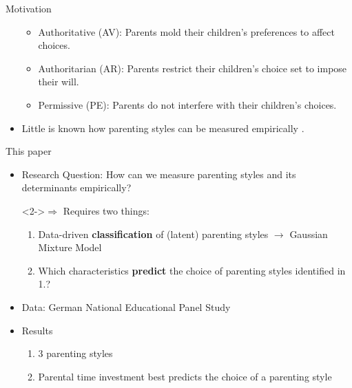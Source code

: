\documentclass[notes, 12.5pt, aspectratio=169]{beamer}
\begin{document}
\begin{frame}{Motivation}
\begin{itemize}[(I)]
\begin{itemize}
			\item<4-> Authoritative (AV): Parents mold their children's preferences to affect choices.
			\item<5-> Authoritarian (AR): Parents restrict their children's choice set to impose their will.
			\item<6-> Permissive (PE): Parents do not interfere with their children's choices.
		\end{itemize}
		\vspace{10pt}
		\item<7-> Little is known how parenting styles can be measured empirically \parencites{chanParentingStyleYouth2011}{rauhParentingTypes2020}.
	\end{itemize}
\end{frame}
%
\begin{frame}{This paper}
	\begin{itemize}[(I)]
		\item<1-> Research Question: How can we measure parenting styles and its determinants empirically?
		\item[]<2->$\Longrightarrow$ Requires two things:
		\begin{enumerate}
			\item<2-> Data-driven \textbf{classification} of (latent) parenting styles $\rightarrow$ Gaussian Mixture Model \parencite{hastieElementsStatisticalLearning2009}
			\item<3-> Which characteristics \textbf{predict} the choice of parenting styles identified in 1.?
		\end{enumerate}
		\vspace{10pt}
		\item<5-> Data: German National Educational Panel Study \parencite{nepsnationaleducationalpanelstudybamberggermanyNEPSStartingCohort2021}
		\vspace{10pt}
		\item<6-> Results
		\begin{enumerate}
			\item<6-> 3 parenting styles 
			\item<7-> Parental time investment best predicts the choice of a parenting style
		\end{enumerate}
	\end{itemize}
\end{frame}
\end{document}
